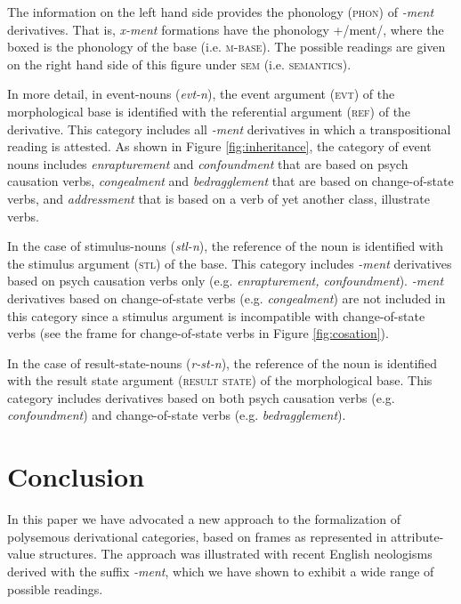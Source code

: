 \documentclass[output=paper]{langsci/langscibook}
\begin{document}
The information on the left hand side provides the phonology (\textsc{phon}) of \textit{-ment} derivatives. That is, \textit{x-ment} formations have the phonology +/ment/, where the boxed  is the phonology of the base (i.e. \textsc{m-base}). The possible readings are given on the right hand side of this figure under \textsc{sem} (i.e. \textsc{semantics}).

In more detail, in event-nouns (\textit{evt-n}), the event argument (\textsc{evt}) of the morphological base is identified with the referential argument (\textsc{ref}) of the derivative. This category includes all \textit{-ment} derivatives in which a transpositional reading is attested. As shown in Figure \ref{fig:inheritance}, the category of event nouns includes \textit{enrapturement} and \textit{confoundment} that are based on psych causation verbs, \textit{congealment} and \textit{bedragglement} that are based on change-of-state verbs, and \textit{addressment} that is based on a verb of yet  another class, illustrate verbs.

In the case of stimulus-nouns (\textit{stl-n}), the reference of the noun is identified with the stimulus argument (\textsc{stl}) of the base. This category includes \textit{-ment} derivatives based on psych causation verbs only (e.g. \textit{enrapturement, confoundment}). \textit{-ment} derivatives based on change-of-state verbs (e.g. \textit{congealment}) are not included in this category since a stimulus argument is incompatible with change-of-state verbs (see the frame for change-of-state verbs in Figure \ref{fig:cosation}).

In the case of result-state-nouns (\textit{r-st-n}), the reference of the noun is identified with the result state argument (\textsc{result state}) of the morphological base. This category includes derivatives based on both psych causation verbs (e.g. \textit{confoundment}) and change-of-state verbs (e.g. \textit{bedragglement}).

\section{Conclusion}
\largerpage[-1]
In this paper we have advocated a new approach to the formalization of polysemous derivational categories, based on frames as represented in attribute-value structures. The approach was illustrated with recent English neologisms derived with the suffix \textit{-ment}, which we have shown to exhibit a wide range of possible readings.
\end{document}
